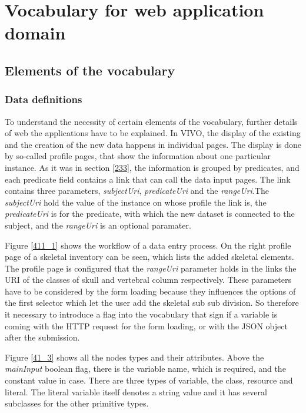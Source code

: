 \chapter{Vocabulary for web application domain}


\section{Elements of the vocabulary}

\subsection{Data definitions}

To understand the necessity of certain elements of the vocabulary, further details of web the applications have to be explained. In VIVO, the display of the existing and the creation of the new data happens in individual pages. The display is done by so-called profile pages, that show the information about one particular instance. As it was in section \ref{233}, the information is grouped by predicates, and each predicate field contains a link that can call the data input pages. The link contains three parameters, \textit{subjectUri}, \textit{predicateUri} and the \textit{rangeUri}.The \textit{subjectUri} hold the value of the instance on whose profile the link is, the \textit{predicateUri} is for the predicate, with which the new dataset is connected to the subject, and the \textit{rangeUri} is an optional paramater.



Figure \ref{411_1} shows the workflow of a data entry process. On the right profile page of a skeletal inventory can be seen, which lists the added skeletal elements. The profile page is configured that the \textit{rangeUri} parameter holds in the links the URI of the classes of  skull and vertebral column respectively. These parameters have to be considered by the form loading because they influences the options of the first selector which let the user add the skeletal sub sub division. So therefore it necessary to introduce a flag into the vocabulary that sign if a variable is coming with the HTTP request for the form loading, or with the JSON object after the submission.

Figure \ref{41_3} shows all the nodes types and their attributes. Above the \textit{mainInput} boolean flag, there is the variable name, which is required, and the constant value in case. There are three types of variable, the class, resource and literal. The literal variable itself denotes a string value and it has several subclasses for the other primitive types.

